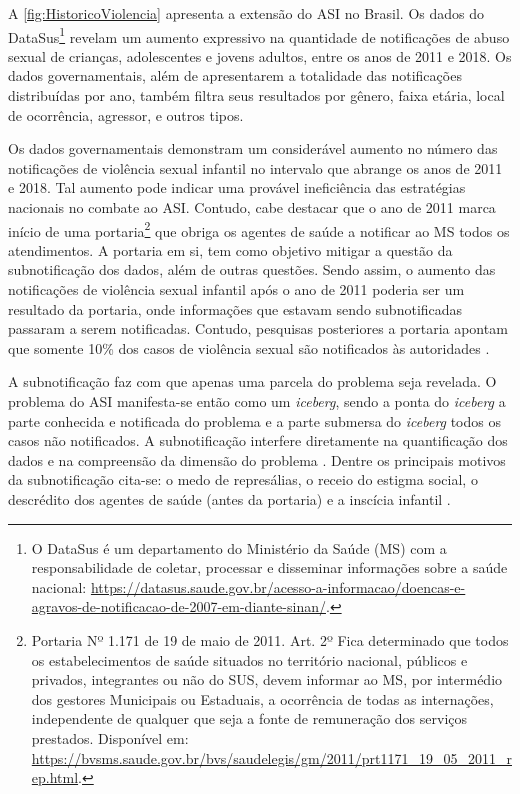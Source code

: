 A \autoref{fig:HistoricoViolencia} apresenta a extensão do \ac{ASI} no Brasil. Os dados do DataSus\footnote{O DataSus é um departamento do Ministério da Saúde (MS) com a responsabilidade de coletar, processar e disseminar informações sobre a saúde nacional: \url{https://datasus.saude.gov.br/acesso-a-informacao/doencas-e-agravos-de-notificacao-de-2007-em-diante-sinan/}.} revelam um aumento expressivo na quantidade de notificações de abuso sexual de crianças, adolescentes e jovens adultos, entre os anos de 2011 e 2018. Os dados governamentais, além de apresentarem a totalidade das notificações distribuídas por ano, também filtra seus resultados por gênero, faixa etária, local de ocorrência, agressor, e outros tipos. 

Os dados governamentais demonstram um considerável aumento no número das notificações de violência sexual infantil no intervalo que abrange os anos de 2011 e 2018. Tal aumento pode indicar uma provável ineficiência das estratégias nacionais no combate ao \ac{ASI}. Contudo, cabe destacar que o ano de 2011 marca início de uma portaria\footnote{\label{note:nota0}Portaria Nº 1.171 de 19 de maio de 2011. Art. 2º Fica determinado que todos os estabelecimentos de saúde situados no território nacional, públicos e privados, integrantes ou não do \ac{SUS}, devem informar ao \acf{MS}, por intermédio dos gestores Municipais ou Estaduais, a ocorrência de todas as internações, independente de qualquer que seja a fonte de remuneração dos serviços prestados. Disponível em: \url{https://bvsms.saude.gov.br/bvs/saudelegis/gm/2011/prt1171_19_05_2011_rep.html}.} que obriga os agentes de saúde a notificar ao \ac{MS} todos os atendimentos. A portaria em si, tem como objetivo mitigar a questão da subnotificação dos dados, além de outras questões. Sendo assim, o aumento das notificações de violência sexual infantil após o ano de 2011 poderia ser um resultado da portaria, onde informações que estavam sendo subnotificadas passaram a serem notificadas. Contudo, pesquisas posteriores a portaria apontam que somente 10\% dos casos de violência sexual são notificados às autoridades \cite{brasil2020abuso}. 

A subnotificação faz com que apenas uma parcela do problema seja revelada. O problema do \ac{ASI} manifesta-se então como um \textit{iceberg}, sendo a ponta do \textit{iceberg} a parte conhecida e notificada do problema e a parte submersa do \textit{iceberg} todos os casos não notificados. A subnotificação interfere diretamente na quantificação dos dados e na compreensão da dimensão do problema \cite{deslandes2016atendimento, hora2017violencia}. Dentre os principais motivos da subnotificação cita-se: o medo de represálias, o receio do estigma social, o descrédito dos agentes de saúde (antes da portaria) e a inscícia infantil \cite{fbsp2019anuario, pavao2013impasse}. %

